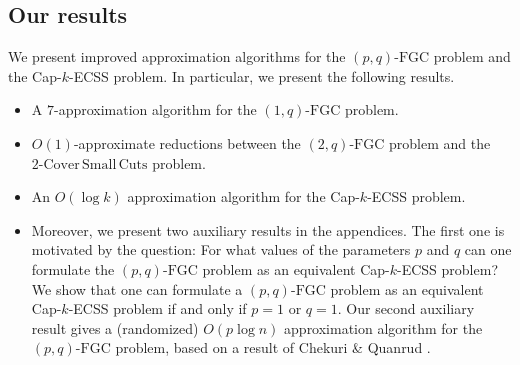 \documentclass[11pt]{article}
\newcommand{\fgc}{\mathrm{FGC}}
\newcommand{\pqfgc}{(p,q)\text{-}\fgc}
\newcommand{\oneqfgc}{(1,q)\text{-}\fgc}
\newcommand{\twoqfgc}{(2,q)\text{-}\fgc}
\newcommand{\oneqfgcapx}{7}
\newcommand\twoASC{\mathrm{2\text{-}Cover\,Small\,Cuts}}
\begin{document}
\subsection*{Our results}

We present improved approximation algorithms for the $\pqfgc$ problem and the Cap-$k$-ECSS problem.
In particular, we present the following results.
\begin{itemize}
\item A $\oneqfgcapx$-approximation algorithm for the $\oneqfgc$ problem.

\item $O(1)$-approximate reductions between the $\twoqfgc$ problem and the $\twoASC$ problem.

\item An $O(\log{k})$ approximation algorithm for the Cap-$k$-ECSS problem.

\item Moreover, we present two auxiliary results in the appendices.
The first one is motivated by the question:
For what values of the parameters $p$ and $q$ can one formulate
the $\pqfgc$ problem as an equivalent Cap-$k$-ECSS problem?
We show that one can formulate a $\pqfgc$ problem as an equivalent
Cap-$k$-ECSS problem if and only if $p=1$ or $q=1$.
Our second auxiliary result gives a (randomized) $O(p\log{n})$
approximation algorithm for the $\pqfgc$ problem, based on a result of Chekuri \& Quanrud \cite{CQ:soda19}.
\end{itemize}
\end{document}
